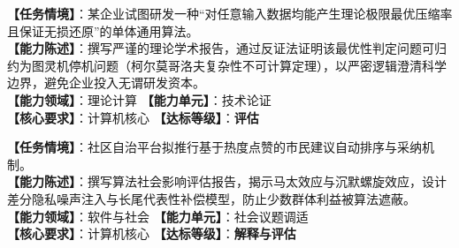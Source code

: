 \begin{taskbox}[任务 6：数据最优无损压缩极限的理论不可判定性论证]
\textbf{【任务情境】}：某企业试图研发一种“对任意输入数据均能产生理论极限最优压缩率且保证无损还原”的单体通用算法。\\
\textbf{【能力陈述】}：撰写严谨的理论学术报告，通过反证法证明该最优性判定问题可归约为图灵机停机问题（柯尔莫哥洛夫复杂性不可计算定理），以严密逻辑澄清科学边界，避免企业投入无谓研发资本。\\
\textbf{【能力领域】}：理论计算 \quad \textbf{【能力单元】}：技术论证\\
\textbf{【核心要求】}：计算机核心 \quad \textbf{【达标等级】}：\textbf{评估}
\end{taskbox}

\begin{taskbox}[任务 7：全民点赞与建议评级推荐算法的社会与伦理审计]
\textbf{【任务情境】}：社区自治平台拟推行基于热度点赞的市民建议自动排序与采纳机制。\\
\textbf{【能力陈述】}：撰写算法社会影响评估报告，揭示马太效应与沉默螺旋效应，设计差分隐私噪声注入与长尾代表性补偿模型，防止少数群体利益被算法遮蔽。\\
\textbf{【能力领域】}：软件与社会 \quad \textbf{【能力单元】}：社会议题调适\\
\textbf{【核心要求】}：计算机核心 \quad \textbf{【达标等级】}：\textbf{解释与评估}
\end{taskbox}

